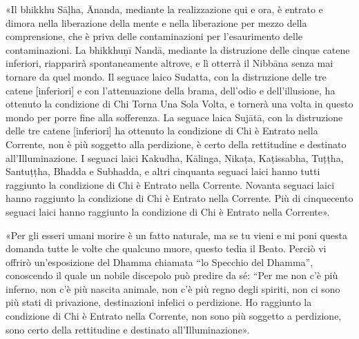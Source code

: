 «Il bhikkhu Sāḷha, Ānanda, mediante la realizzazione qui e ora, è
entrato e dimora nella liberazione della mente e nella liberazione per
mezzo della comprensione, che è priva delle contaminazioni per
l’esaurimento delle contaminazioni. La bhikkhuṇī Nandā, mediante la
distruzione delle cinque catene inferiori, riapparirà spontaneamente
altrove, e lì otterrà il Nibbāna senza mai tornare da quel mondo. Il
seguace laico Sudatta, con la distruzione delle tre catene [inferiori] e
con l’attenuazione della brama, dell’odio e dell’illusione, ha ottenuto
la condizione di Chi Torna Una Sola Volta, e tornerà una volta in questo
mondo per porre fine alla sofferenza. La seguace laica Sujātā, con la
distruzione delle tre catene [inferiori] ha ottenuto la condizione di
Chi è Entrato nella Corrente, non è più soggetto alla perdizione, è
certo della rettitudine e destinato all’Illuminazione. I seguaci laici
Kakudha, Kālinga, Nikaṭa, Kaṭissabha, Tuṭṭha, Santuṭṭha, Bhadda e
Subhadda, e altri cinquanta seguaci laici hanno tutti raggiunto la
condizione di Chi è Entrato nella Corrente. Novanta seguaci laici hanno
raggiunto la condizione di Chi è Entrato nella Corrente. Più di
cinquecento seguaci laici hanno raggiunto la condizione di Chi è Entrato
nella Corrente».


«Per gli esseri umani morire è un fatto naturale, ma se tu vieni e mi
poni questa domanda tutte le volte che qualcuno muore, questo tedia il
Beato. Perciò vi offrirò un’esposizione del Dhamma chiamata “lo Specchio
del Dhamma”, conoscendo il quale un nobile discepolo può predire da sé:
“Per me non c’è più inferno, non c’è più nascita animale, non c’è più
regno degli spiriti, non ci sono più stati di privazione, destinazioni
infelici o perdizione. Ho raggiunto la condizione di Chi è Entrato nella
Corrente, non sono più soggetto a perdizione, sono certo della
rettitudine e destinato all’Illuminazione».


